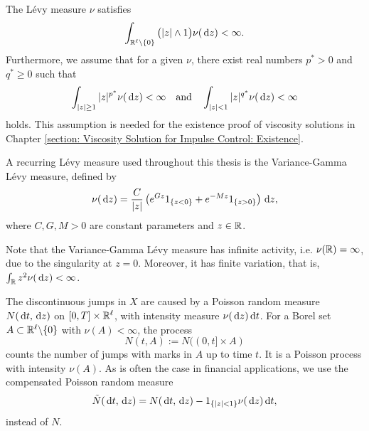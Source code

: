 The Lévy measure $\nu$ satisfies
\begin{equation}
    \int_{\mathbb{R}^\ell \backslash \{0\}} \big( |z| \wedge 1 \big) \nu(\,\mathrm{d} z) < \infty. 
    \label{eqn: Lévy measure condition}
\end{equation}
Furthermore, we assume that for a given $\nu$, there exist real numbers $p^*>0$ and $q^*\geq 0$ such that 
\begin{equation}
    \int_{|z|\geq 1} |z|^{p^*} \nu(\,\mathrm{d} z) < \infty \quad \text{and} \quad \int_{|z|<1}|z|^{q^*}\nu(\,\mathrm{d} z) < \infty
    \label{eqn: assumption for chapter 4}
\end{equation}
holds. This assumption is needed for the existence proof of viscosity solutions in Chapter \ref{section: Viscosity Solution for Impulse Control: Existence}. 
\begin{example}
\label{ex: VG measure}
    A recurring Lévy measure used throughout this thesis is the Variance-Gamma Lévy measure, defined by
    \begin{equation}
        \nu(\,\mathrm{d} z) = \frac{C}{|z|} \left(e^{Gz} 1_{\left\{z<0\right\}} + e^{-Mz} 1_{\left\{z>0\right\}} \right)\,\mathrm{d} z,
        \label{eqn: VG Levy measure}
    \end{equation}
    where $C,G,M>0$ are constant parameters and $z \in \mathbb{R}$.
\end{example}
\begin{remark}
\label{remark: properties of VG measure}
    Note that the Variance-Gamma Lévy measure has infinite activity, i.e. $\nu(\mathbb{R}) = \infty$, due to the singularity at $z=0$. Moreover, it has finite variation, that is, $\int_{\mathbb{R}} z^2 \nu(\,\mathrm{d} z) < \infty$.
\end{remark}
The discontinuous jumps in $X$ are caused by a Poisson random measure $N(\,\mathrm{d} t, \,\mathrm{d} z)$ on $[0,T]\times \mathbb{R}^\ell$, with intensity measure $\nu(\,\mathrm{d} z) \,\mathrm{d} t$. For a Borel set $A \subset \mathbb{R}^\ell \backslash \{0\}$ with $\nu(A)<\infty$, the process
\begin{equation*}
    N(t,A) := N((0,t]\times A)
\end{equation*}
counts the number of jumps with marks in $A$ up to time $t$. It is a Poisson process with intensity $\nu(A)$. As is often the case in financial applications, we use the compensated Poisson random measure
\begin{equation*}
    \tilde N(\,\mathrm{d} t, \,\mathrm{d} z) = N(\,\mathrm{d} t, \,\mathrm{d} z) - 1_{\left\{|z|<1\right\}}\nu(\,\mathrm{d} z) \,\mathrm{d} t,
\end{equation*}
instead of $N$. 

